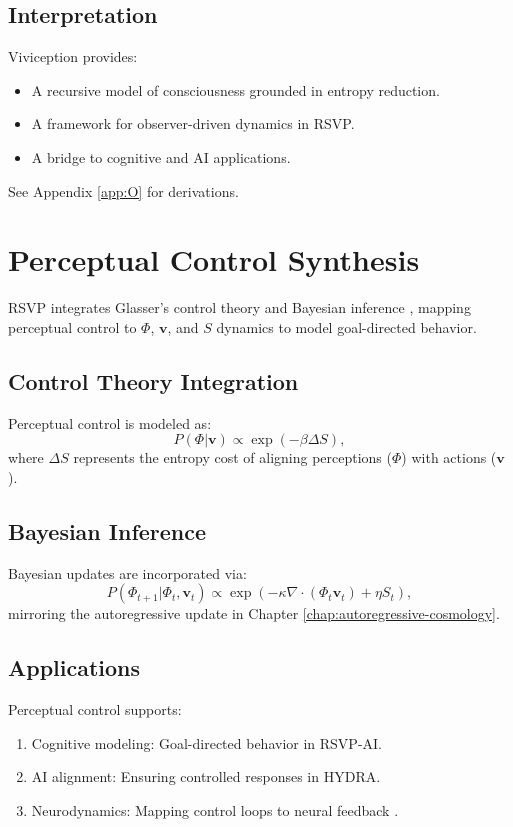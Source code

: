\documentclass[12pt]{report}
\begin{document}
\section{Interpretation}
Viviception provides:
\begin{itemize}
    \item A recursive model of consciousness grounded in entropy reduction.
    \item A framework for observer-driven dynamics in RSVP.
    \item A bridge to cognitive and AI applications.
\end{itemize}
See Appendix \ref{app:O} for derivations.

\chapter{Perceptual Control Synthesis}
\label{chap:perceptual-control}
RSVP integrates Glasser’s control theory \citep{Glasser1985} and Bayesian inference \citep{Friston2010}, mapping perceptual control to \(\Phi\), \(\mathbf{v}\), and \(S\) dynamics to model goal-directed behavior.

\section{Control Theory Integration}
Perceptual control is modeled as:
\begin{equation}
P(\Phi | \mathbf{v}) \propto \exp\left(-\beta \Delta S\right),
\end{equation}
where \(\Delta S\) represents the entropy cost of aligning perceptions (\(\Phi\)) with actions (\(\mathbf{v}\)).

\section{Bayesian Inference}
Bayesian updates are incorporated via:
\[
P(\Phi_{t+1} | \Phi_t, \mathbf{v}_t) \propto \exp\left(-\kappa \nabla \cdot (\Phi_t \mathbf{v}_t) + \eta S_t\right),
\]
mirroring the autoregressive update in Chapter \ref{chap:autoregressive-cosmology}.

\section{Applications}
Perceptual control supports:
\begin{enumerate}
    \item Cognitive modeling: Goal-directed behavior in RSVP-AI.
    \item AI alignment: Ensuring controlled responses in HYDRA.
    \item Neurodynamics: Mapping control loops to neural feedback \citep{Friston2010}.
\end{enumerate}
\end{document}
